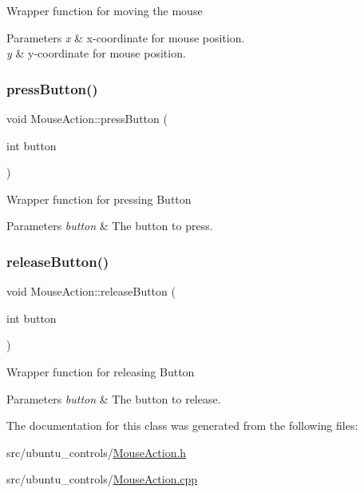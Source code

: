 Wrapper function for moving the mouse


\begin{DoxyParams}{Parameters}
{\em x} & x-\/coordinate for mouse position. \\
\hline
{\em y} & y-\/coordinate for mouse position. \\
\hline
\end{DoxyParams}
\mbox{\label{classMouseAction_aa017b86a7e358e7a74a8ec50a5a191cf}} 
\subsubsection{\texorpdfstring{press\+Button()}{pressButton()}}
{\footnotesize\ttfamily void Mouse\+Action\+::press\+Button (\begin{DoxyParamCaption}\item[{int}]{button }\end{DoxyParamCaption})}

Wrapper function for pressing Button


\begin{DoxyParams}{Parameters}
{\em button} & The button to press. \\
\hline
\end{DoxyParams}
\mbox{\label{classMouseAction_ab1ac193e88baf8614c55ca2fa7a3b430}} 
\subsubsection{\texorpdfstring{release\+Button()}{releaseButton()}}
{\footnotesize\ttfamily void Mouse\+Action\+::release\+Button (\begin{DoxyParamCaption}\item[{int}]{button }\end{DoxyParamCaption})}

Wrapper function for releasing Button


\begin{DoxyParams}{Parameters}
{\em button} & The button to release. \\
\hline
\end{DoxyParams}


The documentation for this class was generated from the following files\+:\begin{DoxyCompactItemize}
\item 
src/ubuntu\+\_\+controls/\hyperlink{MouseAction_8h}{Mouse\+Action.\+h}\item 
src/ubuntu\+\_\+controls/\hyperlink{MouseAction_8cpp}{Mouse\+Action.\+cpp}\end{DoxyCompactItemize}
